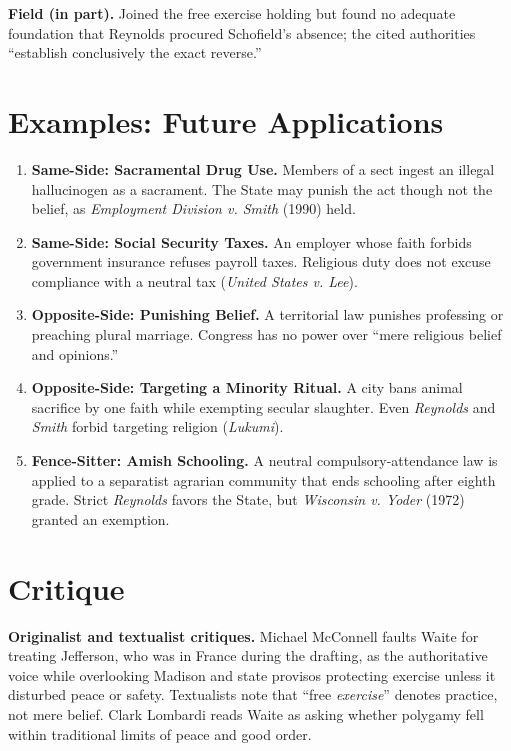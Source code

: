 \documentclass[12pt]{article}
\begin{document}
\textbf{Field (in part).} Joined the free exercise holding but found no adequate foundation that Reynolds procured Schofield's absence; the cited authorities ``establish conclusively the exact reverse.''

\section{Examples: Future Applications}

\begin{enumerate}
\item \textbf{Same-Side: Sacramental Drug Use.} Members of a sect ingest an illegal hallucinogen as a sacrament. The State may punish the act though not the belief, as \textit{Employment Division v. Smith} (1990) held.
\item \textbf{Same-Side: Social Security Taxes.} An employer whose faith forbids government insurance refuses payroll taxes. Religious duty does not excuse compliance with a neutral tax (\textit{United States v. Lee}).
\item \textbf{Opposite-Side: Punishing Belief.} A territorial law punishes professing or preaching plural marriage. Congress has no power over ``mere religious belief and opinions.''
\item \textbf{Opposite-Side: Targeting a Minority Ritual.} A city bans animal sacrifice by one faith while exempting secular slaughter. Even \textit{Reynolds} and \textit{Smith} forbid targeting religion (\textit{Lukumi}).
\item \textbf{Fence-Sitter: Amish Schooling.} A neutral compulsory-attendance law is applied to a separatist agrarian community that ends schooling after eighth grade. Strict \textit{Reynolds} favors the State, but \textit{Wisconsin v. Yoder} (1972) granted an exemption.
\end{enumerate}

\section{Critique}

\textbf{Originalist and textualist critiques.} Michael McConnell faults Waite for treating Jefferson, who was in France during the drafting, as the authoritative voice while overlooking Madison and state provisos protecting exercise unless it disturbed peace or safety. Textualists note that ``free \textit{exercise}'' denotes practice, not mere belief. Clark Lombardi reads Waite as asking whether polygamy fell within traditional limits of peace and good order.
\end{document}
